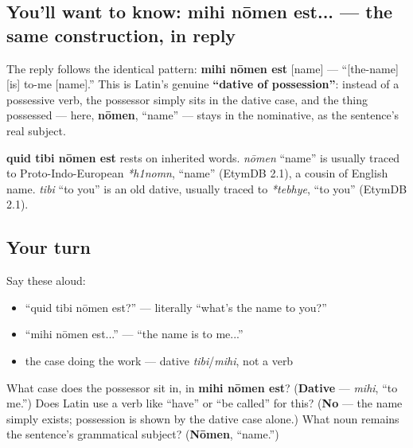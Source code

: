 \subsection*{You'll want to know: mihi nōmen est... — the same construction, in reply}
The reply follows the identical pattern: \textbf{mihi nōmen est} {[}name{]} — \textquotedblleft{}{[}the-name{]} {[}is{]} to-me {[}name{]}.\textquotedblright{} This is Latin's genuine \textbf{\textquotedblleft{}dative of possession\textquotedblright{}}: instead of a possessive verb, the possessor simply sits in the dative case, and the thing possessed — here, \textbf{nōmen}, \textquotedblleft{}name\textquotedblright{} — stays in the nominative, as the sentence's real subject.

\begin{cousinweb}
\textbf{quid tibi nōmen est} rests on inherited words. \emph{nōmen} \textquotedblleft{}name\textquotedblright{} is usually traced to Proto-Indo-European \emph{*h1nomn}, \textquotedblleft{}name\textquotedblright{} (EtymDB 2.1), a cousin of English name. \emph{tibi} \textquotedblleft{}to you\textquotedblright{} is an old dative, usually traced to \emph{*tebhye}, \textquotedblleft{}to you\textquotedblright{} (EtymDB 2.1).
\end{cousinweb}

\subsection*{Your turn}
Say these aloud:

\begin{itemize}
\raggedright
  \item \textquotedblleft{}quid tibi nōmen est?\textquotedblright{} — literally \textquotedblleft{}what's the name to you?\textquotedblright{}
  \item \textquotedblleft{}mihi nōmen est...\textquotedblright{} — \textquotedblleft{}the name is to me...\textquotedblright{}
  \item the case doing the work — dative \emph{tibi}/\emph{mihi}, not a verb
\end{itemize}

\begin{tcolorbox}[breakable,colback=teal!4,colframe=teal!35!black,title={Before you move on}]
What case does the possessor sit in, in \textbf{mihi nōmen est}? (\textbf{Dative} — \emph{mihi}, \textquotedblleft{}to me.\textquotedblright{}) Does Latin use a verb like \textquotedblleft{}have\textquotedblright{} or \textquotedblleft{}be called\textquotedblright{} for this? (\textbf{No} — the name simply exists; possession is shown by the dative case alone.) What noun remains the sentence's grammatical subject? (\textbf{Nōmen}, \textquotedblleft{}name.\textquotedblright{})
\end{tcolorbox}

